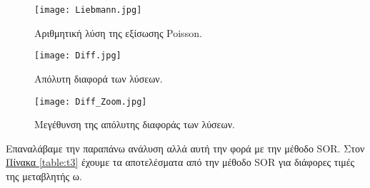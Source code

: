 \documentclass[11pt]{scrartcl} %
\begin{document}
\begin{figure}[H] 

	\centering
	\texttt{[image: Liebmann.jpg]}	
	\caption{Αριθμητική λύση της εξίσωσης Poisson.}
	\label{fig:f7}
\end{figure}



\begin{figure}[H] 

	\centering
	\texttt{[image: Diff.jpg]}	
	\caption{Απόλυτη διαφορά των λύσεων.}
	\label{fig:f8}
\end{figure}



\begin{figure}[H] 

	\centering
	\texttt{[image: Diff\_Zoom.jpg]}	
	\caption{Μεγέθυνση της απόλυτης διαφοράς των λύσεων.}
	\label{fig:f9}
\end{figure}




Επαναλάβαμε την παραπάνω ανάλυση αλλά αυτή την φορά με την μέθοδο SOR. Στον \hyperref[table:t3]{Πίνακα \ref*{table:t3}} έχουμε τα αποτελέσματα από την μέθοδο SOR για διάφορες τιμές της μεταβλητής ω.
\end{document}
